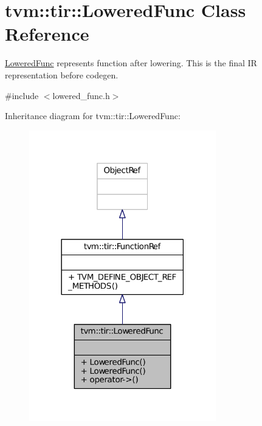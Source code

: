 \hypertarget{classtvm_1_1tir_1_1LoweredFunc}{}\section{tvm\+:\+:tir\+:\+:Lowered\+Func Class Reference}
\label{classtvm_1_1tir_1_1LoweredFunc}


\hyperlink{classtvm_1_1tir_1_1LoweredFunc}{Lowered\+Func} represents function after lowering. This is the final IR representation before codegen.  




{\ttfamily \#include $<$lowered\+\_\+func.\+h$>$}



Inheritance diagram for tvm\+:\+:tir\+:\+:Lowered\+Func\+:
\nopagebreak
\begin{figure}[H]
\begin{center}
\leavevmode
\includegraphics[width=230pt]{classtvm_1_1tir_1_1LoweredFunc__inherit__graph}
\end{center}
\end{figure}


